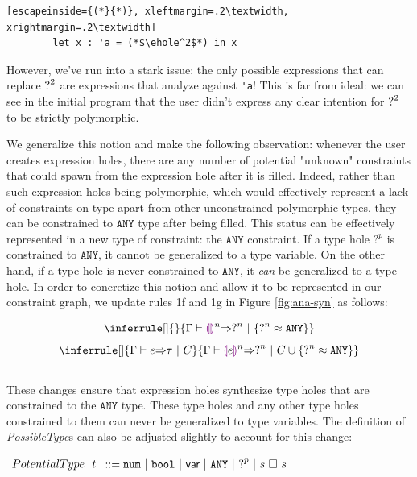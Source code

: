 \begin{center}
    \begin{lstlisting}[escapeinside={(*}{*)}, xleftmargin=.2\textwidth, xrightmargin=.2\textwidth]
        let x : 'a = (*$\ehole^2$*) in x
    \end{lstlisting}
\end{center}

However, we've run into a stark issue: the only possible expressions that can replace $\mathtt{?}^2$ are expressions that analyze against \lstinline{'a}! This is far from ideal: we can see in the initial program that the user didn't express any clear intention for $\mathtt{?}^2$ to be strictly polymorphic.

We generalize this notion and make the following observation: whenever the user creates expression holes, there are any number of potential "unknown" constraints that could spawn from the expression hole after it is filled. Indeed, rather than such expression holes being polymorphic, which would effectively represent a lack of constraints on type apart from other unconstrained polymorphic types, they can be constrained to $\mathtt{ANY}$ type after being filled. This status can be effectively represented in a new type of constraint: the $\mathtt{ANY}$ constraint. If a type hole $?^p$ is constrained to $\mathtt{ANY}$, it cannot be generalized to a type variable. On the other hand, if a type hole is never constrained to $\mathtt{ANY}$, it \emph{can} be generalized to a type hole. In order to concretize this notion and allow it to be represented in our constraint graph, we update rules 1f and 1g in Figure \ref{fig:ana-syn} as follows:

\begin{equation}
    \inferrule[]{ }{
        \consexptyp{\Gamma}{\llparenthesiscolor \rrparenthesiscolor^n}{\tehole^n}{\{ \tehole^n \approx \mathtt{ANY} \}}
      }
\end{equation}
\vspace{-3px}
\begin{equation}
    \inferrule[]{
        \consexptyp{\Gamma}{e}{\tau}{C}
       }{
         \consexptyp{\Gamma}{\llparenthesiscolor e \rrparenthesiscolor^n}{\tehole^n}{C \cup \{ \tehole^n \approx \mathtt{ANY} \}}
       }
\end{equation}
\\
These changes ensure that expression holes synthesize type holes that are constrained to the $\mathtt{ANY}$ type. These type holes and any other type holes constrained to them can never be generalized to type variables. The definition of \emph{PossibleType}s can also be adjusted slightly to account for this change:
\begin{center}
$\arraycolsep=4pt\begin{array}{lll}
PotentialType~~ t & ::= 
  \tnum ~\vert~
  \tbool ~\vert~
  \TVar ~\vert~
  \mathtt{ANY} ~\vert~
  \tehole^p ~\vert~
  s ~\square~ s
  \\
\end{array}$
\end{center}

